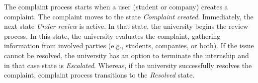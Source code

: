 The complaint process starts when a user (student or company) creates a complaint. The complaint moves to the state \textit{Complaint created}. Immediately, the next state \textit{Under review} is active. In that state, the university begins the review process. In this state, the university evaluates the complaint, gathering information from involved parties (e.g., students, companies, or both). If the issue cannot be resolved, the university has an option to terminate the internship and in that case state is \textit{Escalated}. Whereas, if the university successfully resolves the complaint, complaint process transitions to the \textit{Resolved} state.



